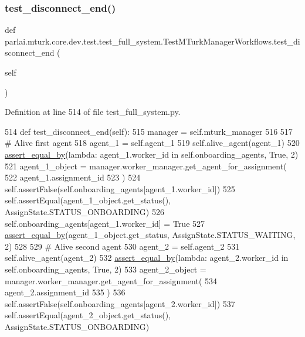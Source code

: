 \subsubsection{\texorpdfstring{test\+\_\+disconnect\+\_\+end()}{test\_disconnect\_end()}}
{\footnotesize\ttfamily def parlai.\+mturk.\+core.\+dev.\+test.\+test\+\_\+full\+\_\+system.\+Test\+M\+Turk\+Manager\+Workflows.\+test\+\_\+disconnect\+\_\+end (\begin{DoxyParamCaption}\item[{}]{self }\end{DoxyParamCaption})}



Definition at line 514 of file test\+\_\+full\+\_\+system.\+py.


\begin{DoxyCode}
514     \textcolor{keyword}{def }test\_disconnect\_end(self):
515         manager = self.mturk\_manager
516 
517         \textcolor{comment}{# Alive first agent}
518         agent\_1 = self.agent\_1
519         self.alive\_agent(agent\_1)
520         \hyperlink{namespaceparlai_1_1mturk_1_1core_1_1test_1_1test__full__system_a0b463246d35658a2e422010f13dcf819}{assert\_equal\_by}(\textcolor{keyword}{lambda}: agent\_1.worker\_id \textcolor{keywordflow}{in} self.onboarding\_agents, \textcolor{keyword}{True}, 2)
521         agent\_1\_object = manager.worker\_manager.get\_agent\_for\_assignment(
522             agent\_1.assignment\_id
523         )
524         self.assertFalse(self.onboarding\_agents[agent\_1.worker\_id])
525         self.assertEqual(agent\_1\_object.get\_status(), AssignState.STATUS\_ONBOARDING)
526         self.onboarding\_agents[agent\_1.worker\_id] = \textcolor{keyword}{True}
527         \hyperlink{namespaceparlai_1_1mturk_1_1core_1_1test_1_1test__full__system_a0b463246d35658a2e422010f13dcf819}{assert\_equal\_by}(agent\_1\_object.get\_status, AssignState.STATUS\_WAITING, 2)
528 
529         \textcolor{comment}{# Alive second agent}
530         agent\_2 = self.agent\_2
531         self.alive\_agent(agent\_2)
532         \hyperlink{namespaceparlai_1_1mturk_1_1core_1_1test_1_1test__full__system_a0b463246d35658a2e422010f13dcf819}{assert\_equal\_by}(\textcolor{keyword}{lambda}: agent\_2.worker\_id \textcolor{keywordflow}{in} self.onboarding\_agents, \textcolor{keyword}{True}, 2)
533         agent\_2\_object = manager.worker\_manager.get\_agent\_for\_assignment(
534             agent\_2.assignment\_id
535         )
536         self.assertFalse(self.onboarding\_agents[agent\_2.worker\_id])
537         self.assertEqual(agent\_2\_object.get\_status(), AssignState.STATUS\_ONBOARDING)

\end{DoxyCode}
